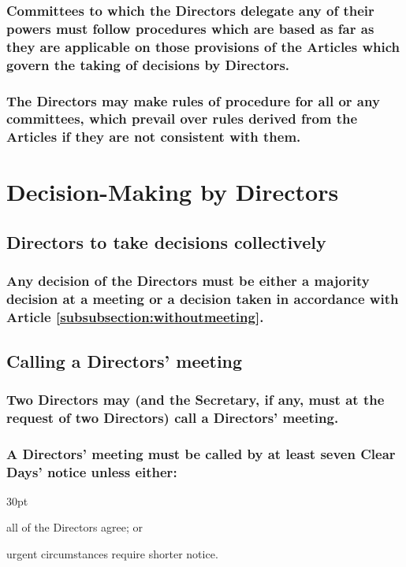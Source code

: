 \documentclass[12pt]{article}
\def\clauseindent{30pt}
\newenvironment{subindentpara}{\begin{adjustwidth}{\clauseindent}{}\begin{hanginglist}}{\end{hanginglist}\end{adjustwidth}}
\begin{document}
\subsubsection{Committees to which the Directors delegate any of their powers must follow procedures which are based as far as they are applicable on those provisions of the Articles which govern the taking of decisions by Directors.}
\subsubsection{The Directors may make rules of procedure for all or any committees, which prevail over rules derived from the Articles if they are not consistent with them.}

\section*{Decision-Making by Directors}

\subsection{Directors to take decisions collectively}
\subsubsection{Any decision of the Directors must be either a majority decision at a meeting or a decision taken in accordance with Article \ref{subsubsection:withoutmeeting}.}

\subsection{Calling a Directors' meeting}
\subsubsection{Two Directors may (and the Secretary, if any, must at the request of two Directors) call a Directors' meeting.}
\subsubsection{A Directors' meeting must be called by at least seven Clear Days' notice unless either:}
\begin{subindentpara}
  \item all of the Directors agree; or
  \item urgent circumstances require shorter notice.
\end{subindentpara}
\end{document}

